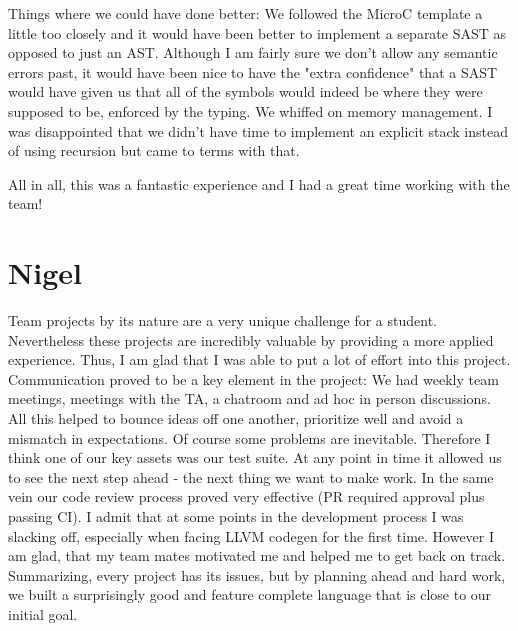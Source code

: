 Things where we could have done better: We followed the MicroC template a little too closely and it would have been better to implement a separate SAST as opposed to just an AST. Although I am fairly sure we don't allow any semantic errors past, it would have been nice to have the "extra confidence" that a SAST would have given us that all of the symbols would indeed be where they were supposed to be, enforced by the typing. We whiffed on memory management. I was disappointed that we didn't have time to implement an explicit stack instead of using recursion but came to terms with that.

All in all, this was a fantastic experience and I had a great time working with the team!

\section{Nigel}
Team projects by its nature are a very unique challenge for a student. Nevertheless these projects are incredibly valuable by providing a more applied experience. Thus, I am glad that I was able to put a lot of effort into this project. Communication proved to be a key element in the project: We had weekly team meetings, meetings with the TA, a chatroom and ad hoc in person discussions. All this helped to bounce ideas off one another, prioritize well and avoid a mismatch in expectations.
Of course some problems are inevitable. Therefore I think one of our key assets was our test suite. At any point in time it allowed us to see the next step ahead - the next thing we want to make work. In the same vein our code review process proved very effective (PR required approval plus passing CI).
I admit that at some points in the development process I was slacking off, especially when facing LLVM codegen for the first time. However I am glad, that my team mates motivated me and helped me to get back on track.
Summarizing, every project has its issues, but by planning ahead and hard work, we built a surprisingly good and feature complete language that is close to our initial goal.

